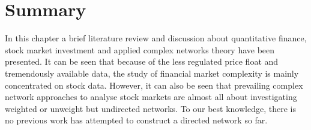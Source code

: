 
\section{Summary}
In this chapter a brief literature review and discussion about quantitative finance, stock market investment and applied complex networks theory have been presented. It can be seen that because of the less regulated price float and tremendously available data, the study of financial market complexity is mainly concentrated on stock data. However, it can also be seen that prevailing complex network approaches to analyse stock markets are almost all about investigating weighted or unweight but undirected networks. To our best knowledge, there is no previous work has attempted to construct a directed network so far.
